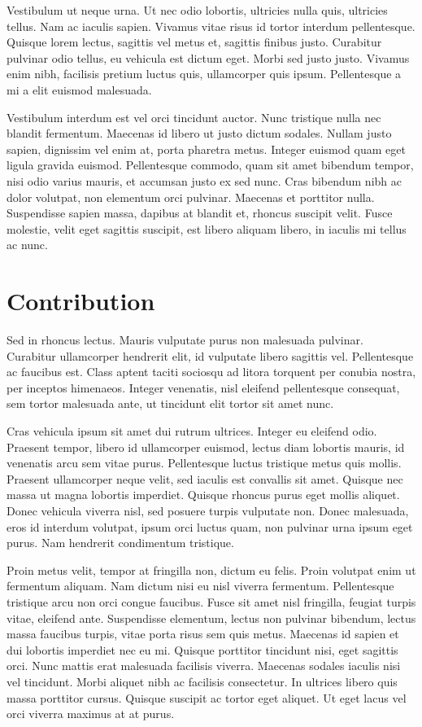 Vestibulum ut neque urna. Ut nec odio lobortis, ultricies nulla quis, ultricies tellus. Nam ac iaculis sapien. Vivamus vitae risus id tortor interdum pellentesque. Quisque lorem lectus, sagittis vel metus et, sagittis finibus justo. Curabitur pulvinar odio tellus, eu vehicula est dictum eget. Morbi sed justo justo. Vivamus enim nibh, facilisis pretium luctus quis, ullamcorper quis ipsum. Pellentesque a mi a elit euismod malesuada.

Vestibulum interdum est vel orci tincidunt auctor. Nunc tristique nulla nec blandit fermentum. Maecenas id libero ut justo dictum sodales. Nullam justo sapien, dignissim vel enim at, porta pharetra metus. Integer euismod quam eget ligula gravida euismod. Pellentesque commodo, quam sit amet bibendum tempor, nisi odio varius mauris, et accumsan justo ex sed nunc. Cras bibendum nibh ac dolor volutpat, non elementum orci pulvinar. Maecenas et porttitor nulla. Suspendisse sapien massa, dapibus at blandit et, rhoncus suscipit velit. Fusce molestie, velit eget sagittis suscipit, est libero aliquam libero, in iaculis mi tellus ac nunc.

\section{Contribution}

Sed in rhoncus lectus. Mauris vulputate purus non malesuada pulvinar. Curabitur ullamcorper hendrerit elit, id vulputate libero sagittis vel. Pellentesque ac faucibus est. Class aptent taciti sociosqu ad litora torquent per conubia nostra, per inceptos himenaeos. Integer venenatis, nisl eleifend pellentesque consequat, sem tortor malesuada ante, ut tincidunt elit tortor sit amet nunc.

Cras vehicula ipsum sit amet dui rutrum ultrices. Integer eu eleifend odio. Praesent tempor, libero id ullamcorper euismod, lectus diam lobortis mauris, id venenatis arcu sem vitae purus. Pellentesque luctus tristique metus quis mollis. Praesent ullamcorper neque velit, sed iaculis est convallis sit amet. Quisque nec massa ut magna lobortis imperdiet. Quisque rhoncus purus eget mollis aliquet. Donec vehicula viverra nisl, sed posuere turpis vulputate non. Donec malesuada, eros id interdum volutpat, ipsum orci luctus quam, non pulvinar urna ipsum eget purus. Nam hendrerit condimentum tristique.

Proin metus velit, tempor at fringilla non, dictum eu felis. Proin volutpat enim ut fermentum aliquam. Nam dictum nisi eu nisl viverra fermentum. Pellentesque tristique arcu non orci congue faucibus. Fusce sit amet nisl fringilla, feugiat turpis vitae, eleifend ante. Suspendisse elementum, lectus non pulvinar bibendum, lectus massa faucibus turpis, vitae porta risus sem quis metus. Maecenas id sapien et dui lobortis imperdiet nec eu mi. Quisque porttitor tincidunt nisi, eget sagittis orci. Nunc mattis erat malesuada facilisis viverra. Maecenas sodales iaculis nisi vel tincidunt. Morbi aliquet nibh ac facilisis consectetur. In ultrices libero quis massa porttitor cursus. Quisque suscipit ac tortor eget aliquet. Ut eget lacus vel orci viverra maximus at at purus.

